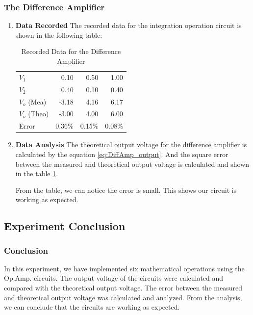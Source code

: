     \subsubsection{The Difference Amplifier}
    \begin{enumerate}[I]
        \item \textbf{Data Recorded}\newline
            The recorded data for the integration operation circuit is shown in the following table:
            \begin{table}[H]
                \centering
                \begin{tabular}{|l|rrr|}
                    \toprule
                    $V_1$ & 0.10  & 0.50  & 1.00 \\
                    $V_2$ & 0.40  & 0.10  & 0.40 \\
                    \midrule
                    $V_o$ (Mea) & -3.18 & 4.16  & 6.17 \\
                    \midrule
                    $V_o$ (Theo) & -3.00 & 4.00  & 6.00 \\
                    Error & 0.36\% & 0.15\% & 0.08\% \\
                    \bottomrule
                    \end{tabular}%
                \caption{Recorded Data for the Difference Amplifier}
                \label{tab:DiffAmp}
            \end{table}

        \item \textbf{Data Analysis}\newline
            The theoretical output voltage for the difference amplifier is calculated by the equation \ref{eq:DiffAmp_output}. And the square error between the measured and theoretical output voltage is calculated and shown in the table \ref{tab:DiffAmp}.\par

            From the table, we can notice the error is small. This shows our circuit is working as expected.\par
    \end{enumerate}


\subsection{Experiment Conclusion}
    \subsubsection{Conclusion}
        In this experiment, we have implemented six mathematical operations using the Op.Amp. circuits. The output voltage of the circuits were calculated and compared with the theoretical output voltage. The error between the measured and theoretical output voltage was calculated and analyzed. From the analysis, we can conclude that the circuits are working as expected.\par